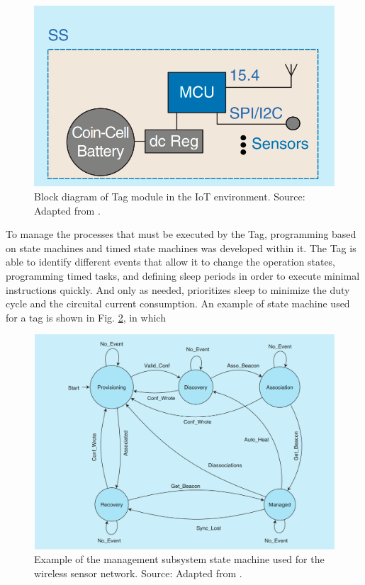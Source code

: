 \documentclass[journal]{IEEEtran}	%
\begin{document}
\begin{figure}[t!]
\centering
\includegraphics[width=0.9\columnwidth]{fig3.png}
\caption{Block diagram of Tag module in the IoT environment. Source: Adapted from \cite{williams2017weaving}.}
\label{fig:tag}
\end{figure}

To manage the processes that must be executed by the Tag, programming based on state machines and timed state machines was developed within it. The Tag is able to identify different events that allow it to change the operation states, programming timed tasks, and defining sleep periods in order to execute minimal instructions quickly. And only as needed, prioritizes sleep to minimize the duty cycle and the circuital current consumption. An example of state machine used for a tag is shown in Fig. \ref{fig:state_machine}, in which

\begin{figure}[!t]
\centering
\includegraphics[width=0.95\columnwidth]{fig6.png}
\caption{Example of the management subsystem state machine used for the wireless sensor network. Source: Adapted from \cite{williams2017weaving}.}
\label{fig:state_machine}
\end{figure}
\end{document}
